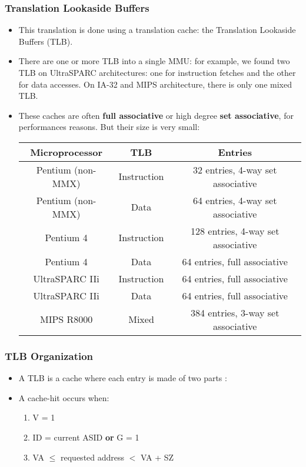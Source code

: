 
\begin{frame}
  \frametitle{Translation Lookaside Buffers}

  \begin{itemize}
    \item
    This translation is done using a translation cache: the
    Translation Lookaside Buffers (TLB).
    \item
    There are one or more TLB into a single MMU: for example, we
    found two TLB on UltraSPARC architectures: one for instruction
    fetches and the other for data accesses. On IA-32 and MIPS
    architecture, there is only one mixed TLB.
    \item
    These caches are often \textbf{full associative} or high degree
    \textbf{set associative}, for performances reasons. But their size
    is very small:
    \begin{tabular}{|c|c|c|}
    \hline
    Microprocessor & TLB & Entries \\
    \hline
    Pentium (non-MMX) & Instruction & 32 entries, 4-way set associative \\
    \hline
    Pentium (non-MMX) & Data & 64 entries, 4-way set associative \\
    \hline
    Pentium 4 & Instruction & 128 entries, 4-way set associative \\
    \hline
    Pentium 4 & Data & 64 entries, full associative \\
    \hline
    UltraSPARC IIi & Instruction & 64 entries, full associative \\
    \hline
    UltraSPARC IIi & Data & 64 entries, full associative \\
    \hline
    MIPS R8000 & Mixed & 384 entries, 3-way set associative \\
    \hline
    \end{tabular}
  \end{itemize}
\end{frame}


\begin{frame}
  \frametitle{TLB Organization}

    \begin{itemize}
      \item A TLB is a cache where each entry is made of two parts :

      \begin{center}
      \end{center}

      \item A cache-hit occurs when:
      \begin{enumerate}
      \item
        V = 1
      \item
        ID = current ASID \textbf{or} G = 1
      \item
        VA $\leq$ requested address $<$ VA + SZ
      \end{enumerate}
    \end{itemize}
\end{frame}

